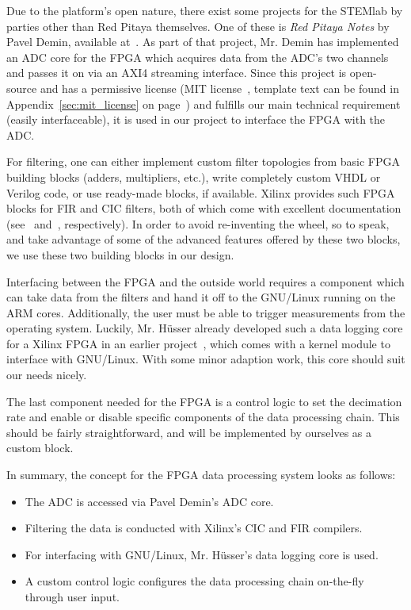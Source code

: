 Due to the  platform's open nature, there exist some  projects for the STEMlab
by parties other than Red Pitaya  themselves. One of these is \emph{Red Pitaya
Notes} by  Pavel Demin, available  at~\cite{pita:github:pitaya-notes}. As part
of that  project, Mr. Demin  has implemented  an ADC core  for the  FPGA which
acquires  data from  the ADC's  two  channels and  passes  it on  via an  AXI4
streaming interface\footnotemark.
Since   this   project  is   open-source   and   has  a   permissive   license
(MIT   license~\cite{licenses:mit},   template   text    can   be   found   in
Appendix~\ref{sec:mit_license} on page~\pageref{sec:mit_license}) and fulfills
our  main technical  requirement (easily  interfaceable),  it is  used in  our
project to interface the FPGA with the ADC.

For filtering,  one can either  implement custom filter topologies  from basic
FPGA building blocks (adders, multipliers, etc.), write completely custom VHDL
or Verilog code, or use ready-made blocks, if available.  Xilinx provides such
FPGA  blocks for  FIR  and CIC  filters,  both of  which  come with  excellent
documentation  (see~\cite{xilinx:cic-compiler} and~\cite{xilinx:fir-compiler},
respectively).  In  order to avoid  re-inventing the  wheel, so to  speak, and
take advantage of  some of the advanced features offered  by these two blocks,
we use these two building blocks in our design.

Interfacing  between the  FPGA  and  the outside  world  requires a  component
which  can take  data  from the  filters  and  hand it  off  to the  GNU/Linux
running  on the  ARM cores. Additionally,  the user  must be  able to  trigger
measurements   from  the   operating  system. Luckily,   Mr. H\"usser already
developed  such  a  data  logging  core  for  a  Xilinx  FPGA  in  an  earlier
project~\cite{pita:github:huess-schnid},  which  comes  with  a  kernel
module to interface  with GNU/Linux. With some minor adaption  work, this core
should suit our needs nicely.

The  last  component needed  for  the  FPGA is  a  control  logic to  set  the
decimation  rate  and  enable  or  disable specific  components  of  the  data
processing  chain. This  should  be   fairly  straightforward,  and   will  be
implemented by ourselves as a custom block.

In summary, the concept for the FPGA data processing system looks as follows:
\begin{itemize}\tightlist
    \item
        The ADC is accessed via Pavel Demin's ADC core.
    \item
        Filtering the data is conducted with Xilinx's CIC and FIR compilers.
    \item
        For interfacing  with GNU/Linux,  Mr. H\"usser's data logging  core is
        used.
    \item
        A custom control logic configures the data processing chain on-the-fly
        through user input.
\end{itemize}

